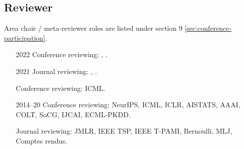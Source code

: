 \documentclass[10pt]{article}
\begin{document}
%

%

%

%

\subsection{Reviewer} \label{sec:reviewer} %

Area chair / meta-reviewer roles are listed under section 9 \ref{sec:conference-participation}.

\begin{itemize}[leftmargin=5em]
  \item[2022] Conference reviewing: , .
  \item[2021] Journal reviewing: , .
  \item[] Conference reviewing: ICML.
  \item[2014--20] Conference reviewing: NeurIPS, ICML, ICLR, AISTATS, AAAI, COLT, SoCG, IJCAI, ECML-PKDD.
  \item[] Journal reviewing: JMLR, IEEE TSP, IEEE T-PAMI, Bernoulli, MLJ, Comptes rendus.
\end{itemize}
\end{document}
